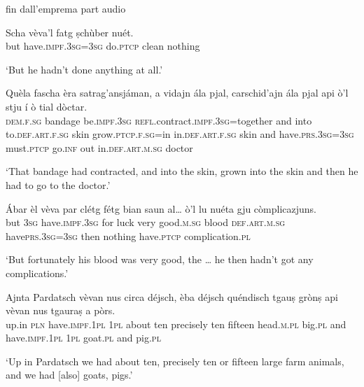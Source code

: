 fin dall'emprema part audio


\begin{linenumbers}
\gll  Scha vèva’l fatg ṣchùber nuét.  \\
but have.\textsc{impf.3sg=3sg} do.\textsc{ptcp} clean nothing \\
\end{linenumbers}
\medskip
\glt `But he hadn’t done anything at all.'
\medskip

\begin{linenumbers}
\gll Quèla fascha èra satrag’ansjáman, a vidajn ála pjal, carschid’ajn ála pjal api ò'l stju í ò tial dòctar.  \\
\textsc{dem.f.sg} bandage be.\textsc{impf.3sg} \textsc{refl.}contract.\textsc{impf.3sg=}together and into to.\textsc{def.art.f.sg} skin grow.\textsc{ptcp.f.sg=}in in.\textsc{def.art.f.sg} skin and have.\textsc{prs.3sg=3sg} must.\textsc{ptcp} go.\textsc{inf} out in.\textsc{def.art.m.sg} doctor \\
\end{linenumbers}
\medskip
\glt `That bandage had contracted, and into the skin, grown into the skin and then he had to go to the doctor.'
\medskip

\begin{linenumbers}
\gll  Ábar èl vèva par clétg fétg bian saun al… ò'l lu nuéta gju còmplicazjuns.  \\
but  \textsc{3sg} have.\textsc{impf.3sg} for luck very good.\textsc{m.sg} blood \textsc{def.art.m.sg} have\textsc{prs.3sg=3sg} then nothing have.\textsc{ptcp} complication.\textsc{pl}  \\
\end{linenumbers}
\medskip
\glt `But fortunately his blood was very good, the … he then hadn’t got any complications.'
\medskip

\begin{linenumbers}
\gll  Ajnta Pardatsch vèvan nus circa déjsch, èba déjsch quéndisch tgauṣ grònṣ api vèvan nus tgauraṣ a pòrs.  \\
up.in  \textsc{pln} have.\textsc{impf.1pl} \textsc{1pl} about ten precisely ten fifteen  head.\textsc{m.pl} big.\textsc{pl} and have.\textsc{impf.1pl} \textsc{1pl} goat.\textsc{pl} and pig.\textsc{pl} \\
\end{linenumbers}
\medskip
\glt `Up in Pardatsch we had about ten, precisely ten or fifteen large farm animals, and we had [also] goats, pigs.'
\medskip

